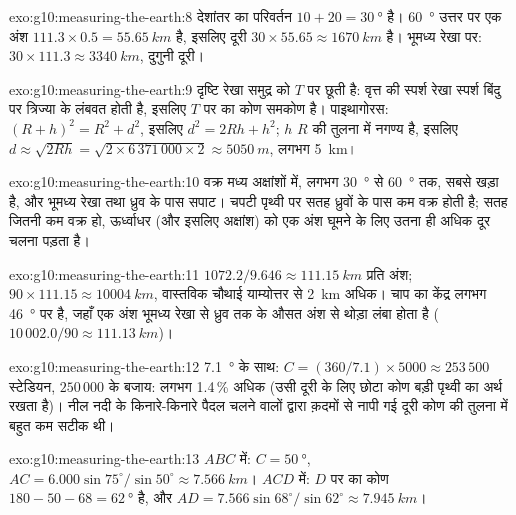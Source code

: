 \begin{solution}{exo:g10:measuring-the-earth:8}
देशांतर का परिवर्तन $10 + 20 = \qty{30}{\degree}$ है।
\qty{60}{\degree} उत्तर पर एक अंश $111.3 \times 0.5 = \qty{55.65}{km}$ है, इसलिए
दूरी $30 \times 55.65 \approx \qty{1670}{km}$ है। भूमध्य रेखा पर:
$30 \times 111.3 \approx \qty{3340}{km}$, दुगुनी दूरी।
\end{solution}

\begin{solution}{exo:g10:measuring-the-earth:9}
दृष्टि रेखा समुद्र को $T$ पर छूती है: वृत्त की स्पर्श रेखा स्पर्श बिंदु पर त्रिज्या के लंबवत
होती है, इसलिए $T$ पर का कोण
समकोण है। पाइथागोरस: $(R+h)^2 = R^2 + d^2$, इसलिए $d^2 = 2Rh + h^2$; $h$
$R$ की तुलना में नगण्य है, इसलिए $d \approx \sqrt{2Rh} = \sqrt{2 \times
6\,371\,000 \times 2} \approx \qty{5050}{m}$, लगभग \qty{5}{km}।
\end{solution}

\begin{solution}{exo:g10:measuring-the-earth:10}
वक्र मध्य अक्षांशों में, लगभग \qty{30}{\degree} से
\qty{60}{\degree} तक, सबसे खड़ा है, और भूमध्य रेखा तथा ध्रुव के पास सपाट। चपटी
पृथ्वी पर सतह ध्रुवों के पास कम वक्र होती है; सतह जितनी कम वक्र हो, ऊर्ध्वाधर (और इसलिए
अक्षांश) को एक अंश घूमने के लिए उतना ही अधिक दूर चलना पड़ता है।
\end{solution}

\begin{solution}{exo:g10:measuring-the-earth:11}
$1072.2/9.646 \approx \qty{111.15}{km}$ प्रति अंश; $90 \times 111.15
\approx \qty{10004}{km}$, वास्तविक चौथाई याम्योत्तर से \qty{2}{km} अधिक।
चाप का केंद्र लगभग \qty{46}{\degree} पर है, जहाँ एक अंश भूमध्य रेखा से ध्रुव तक
के औसत अंश से थोड़ा लंबा होता है
($10\,002.0/90 \approx \qty{111.13}{km}$)।
\end{solution}

\begin{solution}{exo:g10:measuring-the-earth:12}
\qty{7.1}{\degree} के साथ: $C = (360/7.1) \times 5000 \approx 253\,500$ स्टेडियन,
$250\,000$ के बजाय: लगभग 1.4\,\% अधिक (उसी दूरी के लिए छोटा कोण
बड़ी पृथ्वी का अर्थ रखता है)। नील नदी के किनारे-किनारे पैदल चलने वालों द्वारा क़दमों से नापी गई
दूरी कोण की तुलना में बहुत कम सटीक थी।
\end{solution}

\begin{solution}{exo:g10:measuring-the-earth:13}
$ABC$ में: $C = \qty{50}{\degree}$, $AC = 6.000 \sin 75^\circ/\sin 50^\circ
\approx \qty{7.566}{km}$। $ACD$ में: $D$ पर का कोण $180 - 50 - 68 =
\qty{62}{\degree}$ है, और $AD = 7.566 \sin 68^\circ/\sin 62^\circ \approx
\qty{7.945}{km}$।
\end{solution}

